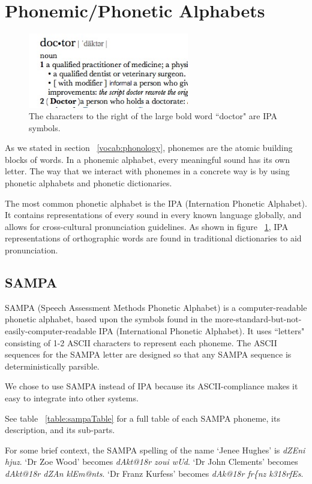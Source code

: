 
\FloatBarrier

\section{Phonemic/Phonetic Alphabets}
\label{section:phonemicAlphabets}
\begin{figure}
\begin{center}
\includegraphics[width=70mm]{doctorDictIPAScreenshot.jpg}
\captionfonts
\caption[Dictionary IPA screenshot]{ The characters to the right of the large bold word ``doctor" are IPA symbols. }
\label{fig:doctorDictIPAScreenshot}
\end{center}
\end{figure}

As we stated in section ~\ref{vocab:phonology}, phonemes are the atomic building blocks of words. In a phonemic alphabet, every meaningful sound has its own letter.  The way that we interact with phonemes in a concrete way is by using phonetic alphabets and phonetic dictionaries.  


The most common phonetic alphabet is the IPA (Internation Phonetic Alphabet). It contains representations of every sound in every known language globally, and allows for cross-cultural pronunciation guidelines.  As shown in figure ~\ref{fig:doctorDictIPAScreenshot}, IPA representations of orthographic words are found in traditional dictionaries to aid pronunciation. 

\subsection{SAMPA}
\label{section:sampaAlphabet}

SAMPA (Speech Assessment Methods Phonetic Alphabet) is a computer-readable phonetic alphabet, based upon the symbols found in the more-standard-but-not-easily-computer-readable  IPA (International Phonetic Alphabet).  
It uses ``letters" consisting of 1-2 ASCII characters to represent each phoneme. The ASCII sequences for the SAMPA letter are designed so that any SAMPA sequence is deterministically parsible.

We chose to use SAMPA instead of IPA because its ASCII-compliance makes it easy to integrate into other systems.

See table ~\ref{table:sampaTable} for a full table of each SAMPA phoneme, its description, and its sub-parts.

For some brief context, the SAMPA spelling of the name `Jenee Hughes' is \emph{dZEni hjuz}.  
`Dr Zoe Wood'  becomes \emph{dAkt@\char18r zoui wUd}.  
`Dr John Clements' becomes \emph{dAkt@\char18r dZAn klEm@nts}. 
`Dr Franz Kurfess' becomes \emph{dAk@\char18r fr\{nz k3\char18rfEs}.



